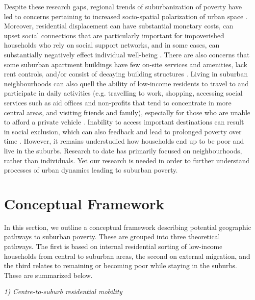 Despite these research gaps, regional trends of suburbanization of poverty have led to concerns pertaining to increased socio-spatial polarization of urban space \cite{hulchanski_three_2010,walks_income_2013,ades_are_2012}. Moreover, residential displacement can have substantial monetary costs, can upset social connections that are particularly important for impoverished households who rely on social support networks, and in some cases, can substantially negatively effect individual well-being  \cite{vigdor_does_2002,august_challenging_2014,elliott-cooper_moving_2020}. There are also concerns that some suburban apartment buildings have few on-site services and amenities, lack rent controls, and/or consist of decaying building structures \cite{short_decline_2007,august_gentrification_2018}. Living in suburban neighbourhoods can also quell the ability of low-income residents to travel to and participate in daily activities (e.g. travelling to work, shopping, accessing social services such as aid offices and non-profits that tend to concentrate in more central areas, and visiting friends and family), especially for those who are unable to afford a private vehicle \cite{allen_planning_2020}. Inability to access important destinations can result in social exclusion, which can also feedback and lead to prolonged poverty over time \cite{lucas_transport_2012}. However, it remains understudied how households end up to be poor and live in the suburbs. Research to date has primarily focused on neighbourhoods, rather than individuals. Yet our research is needed in order to further understand processes of urban dynamics leading to suburban poverty.





\section{Conceptual Framework}

In this section, we outline a conceptual framework describing potential geographic pathways to suburban poverty. These are grouped into three theoretical pathways. The first is based on internal residential sorting of low-income households from central to suburban areas, the second on external migration, and the third relates to remaining or becoming poor while staying in the suburbs. These are summarized below.



\textit{1) Centre-to-suburb residential mobility}

